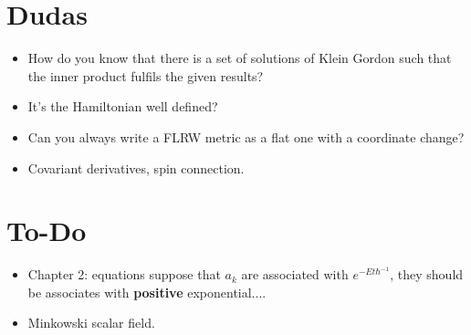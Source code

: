 \section{Dudas}
\begin{itemize}
	\item How do you know that there is a set of solutions of Klein Gordon such that the inner product fulfils the given results?
	\item It's the Hamiltonian well defined?
	\item Can you always write a FLRW metric as a flat one with a coordinate change?
	\item Covariant derivatives, spin connection.
\end{itemize}
\section{To-Do}
\begin{itemize}
	\item Chapter 2: equations suppose that $a_k$ are associated with $e^{-Et\hbar^{-1}}$, they should be associates with \textbf{positive} exponential....
	\item Minkowski scalar field.
\end{itemize}